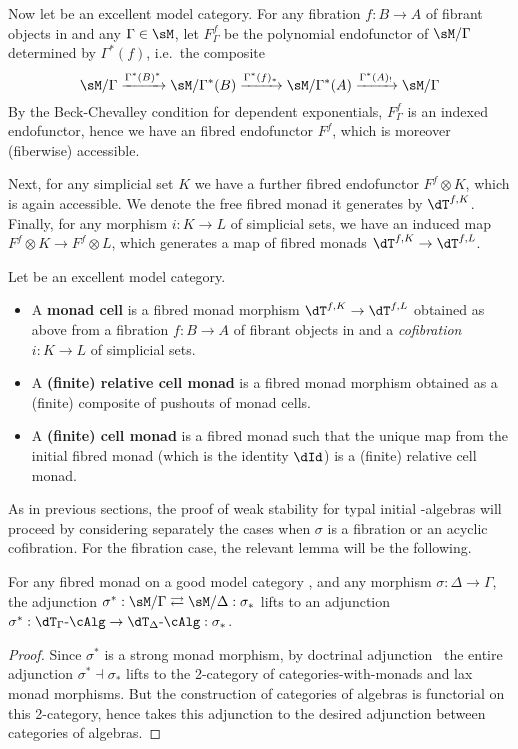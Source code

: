 \begin{enumerate}
\begin{enumerate}
Now let \sM be an excellent model category.
For any fibration $f:B\to A$ of fibrant objects in \sM and any $\Gamma\in\sM$, let $F^f_\Gamma$ be the polynomial endofunctor of $\sM/\Gamma$ determined by $\Gamma^*(f)$, i.e.\ the composite
\[ \sM/\Gamma \xto{\Gamma^*(B)^*} \sM/\Gamma^*(B) \xto{\Gamma^*(f)_*} \sM/\Gamma^*(A) \xto{\Gamma^*(A)_!} \sM/\Gamma \]
By the Beck-Chevalley condition for dependent exponentials, $F^f_\Gamma$ is an indexed endofunctor, hence we have an fibred endofunctor $F^f$, which is moreover (fiberwise) accessible.

Next, for any simplicial set $K$ we have a further fibred endofunctor $F^f \otimes K$, which is again accessible.
We denote the free fibred monad it generates by $\dT^{f,K}$.
Finally, for any morphism $i:K\to L$ of simplicial sets, we have an induced map $F^f \otimes K \to F^f \otimes L$, which generates a map of fibred monads $\dT^{f,K}\to \dT^{f,L}$.

\begin{defn}
  Let \sM be an excellent model category.
  \begin{itemize}
  \item A \textbf{monad cell} is a fibred monad morphism $\dT^{f,K} \to \dT^{f,L}$ obtained as above from a fibration $f:B\to A$ of fibrant objects in \sM and a \emph{cofibration} $i:K\to L$ of simplicial sets.
  \item A \textbf{(finite) relative cell monad} is a fibred monad morphism obtained as a (finite) composite of pushouts of monad cells.
  \item A \textbf{(finite) cell monad} is a fibred monad \dT such that the unique map from the initial fibred monad (which is the identity $\dId$) is a (finite) relative cell monad.
  \end{itemize}
\end{defn}

As in previous sections, the proof of weak stability for typal initial \dT-algebras will proceed by considering separately the cases when $\sigma$ is a fibration or an acyclic cofibration.
For the fibration case, the relevant lemma will be the following.

\begin{lem}\label{thm:fibmnd-radj}
  For any fibred monad \dT on a good model category \sM, and any morphism $\sigma:\Delta\to\Gamma$, the adjunction $\sigma^*: \sM/\Gamma \toot \sM/\Delta : \sigma_*$ lifts to an adjunction $\sigma^*:\dT_\Gamma\alg \to \dT_\Delta\alg: \sigma_*$.
\end{lem}
\begin{proof}
  Since $\sigma^*$ is a strong monad morphism, by doctrinal adjunction~\cite{kelly:doc-adjn} the entire adjunction $\sigma^*\dashv\sigma_*$ lifts to the 2-category of categories-with-monads and lax monad morphisms.
  But the construction of categories of algebras is functorial on this 2-category, hence takes this adjunction to the desired adjunction between categories of algebras.
\end{proof}


\end{enumerate}
\end{enumerate}
